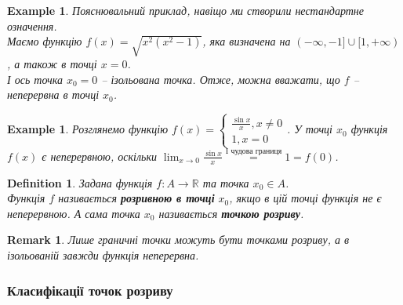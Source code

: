 \documentclass[a4paper, 14pt]{article}
\theoremstyle{theoremdd}
\theoremstyle{theoremdd}
\newtheorem{definition}[theorem]{Definition}
\theoremstyle{theoremdd}
\theoremstyle{theoremdd}
\newtheorem{example}[theorem]{Example}
\theoremstyle{theoremdd}
\theoremstyle{theoremdd}
\newtheorem{remark}[theorem]{Remark}
\theoremstyle{theoremdd}
\theoremstyle{theoremdd}
\begin{document}
\begin{example}
Пояснювальний приклад, навіщо ми створили нестандартне означення.\\
Маємо функцію $f(x) = \sqrt{x^2(x^2-1)}$, яка визначена на $(-\infty,-1] \cup [1,+\infty)$, а також в точці $x = 0$.\\
І ось точка $x_0 = 0$ -- ізольована точка. Отже, можна вважати, що $f$ -- неперервна в точці $x_0$.
\\ %
\end{example}

\begin{example}
Розглянемо функцію $f(x) = \begin{cases} \displaystyle \frac{\sin x}{x}, x \neq 0 \\ 1, x = 0 \end{cases}$. У точці $x_0$ функція $f(x)$ є неперервною, оскільки
$\displaystyle \lim_{x \to 0} \frac{\sin x}{x} \overset{\textrm{I чудова границя}}{=} 1 = f(0)$.
\end{example}

\begin{definition}
Задана функція $f \colon A \to \mathbb{R}$ та точка $x_0 \in A$.\\
Функція $f$ називається \textbf{розривною в точці} $x_0$, якщо в цій точці функція не є неперервною. А сама точка $x_0$ називається \textbf{точкою розриву}.
\end{definition}

\begin{remark}
Лише граничні точки можуть бути точками розриву, а в ізольованій завжди функція неперервна.
\end{remark}

\subsubsection*{Класифікації точок розриву}
\end{document}
